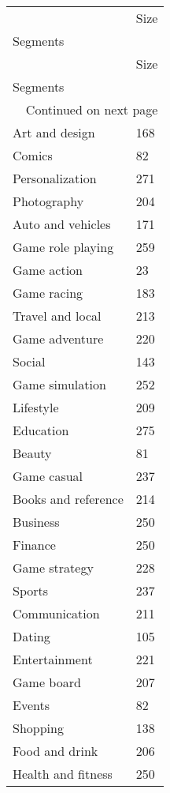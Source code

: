 \begin{longtable}[h!]{ll}
\toprule
{} &  Size \\
Segments            &       \\
\midrule
\endfirsthead

\toprule
{} &  Size \\
Segments            &       \\
\midrule
\endhead
\midrule
\multicolumn{2}{r}{{Continued on next page}} \\
\midrule
\endfoot

\bottomrule
\endlastfoot
Art and design      &   168 \\
Comics              &    82 \\
Personalization     &   271 \\
Photography         &   204 \\
Auto and vehicles   &   171 \\
Game role playing   &   259 \\
Game action         &    23 \\
Game racing         &   183 \\
Travel and local    &   213 \\
Game adventure      &   220 \\
Social              &   143 \\
Game simulation     &   252 \\
Lifestyle           &   209 \\
Education           &   275 \\
Beauty              &    81 \\
Game casual         &   237 \\
Books and reference &   214 \\
Business            &   250 \\
Finance             &   250 \\
Game strategy       &   228 \\
Sports              &   237 \\
Communication       &   211 \\
Dating              &   105 \\
Entertainment       &   221 \\
Game board          &   207 \\
Events              &    82 \\
Shopping            &   138 \\
Food and drink      &   206 \\
Health and fitness  &   250 \\

\end{longtable}
